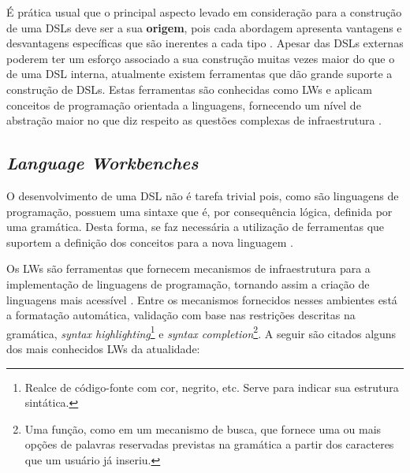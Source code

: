 É prática usual que o principal aspecto levado em consideração para a construção de uma \acp{DSL} deve ser a sua \textbf{origem}, pois cada abordagem apresenta vantagens e desvantagens específicas que são inerentes a cada tipo \cite{Fowler:2010}. 
Apesar das \acp{DSL} externas poderem ter um esforço associado a sua construção muitas vezes maior do que o de uma \ac{DSL} interna, atualmente existem ferramentas que dão grande suporte a construção de \acp{DSL}. 
Estas ferramentas são conhecidas como \acp{LW} e aplicam conceitos de programação orientada a linguagens, fornecendo um nível de abstração maior no que diz respeito as questões complexas de infraestrutura \cite{Fowler:2005}.
    
\subsection{\textit{Language Workbenches}} \label{ssec:LW}

O desenvolvimento de uma \ac{DSL} não é tarefa trivial pois, como são linguagens de programação, possuem uma sintaxe que é, por consequência lógica, definida por uma gramática. 
Desta forma, se faz necessária a utilização de ferramentas que suportem a definição dos conceitos para a nova linguagem \cite{Fowler:2005}.

Os \acp{LW} são ferramentas que fornecem mecanismos de infraestrutura para a implementação de linguagens de programação, tornando assim a criação de linguagens mais acessível \cite{Wachsmuth:2014}. 
Entre os mecanismos fornecidos nesses ambientes está a formatação automática, validação com base nas restrições descritas na gramática, \textit{syntax highlighting}\footnote{Realce de código-fonte com cor, negrito, etc. Serve para indicar sua estrutura sintática.} e \textit{syntax completion}\footnote{Uma função, como em um mecanismo de busca, que fornece uma ou mais opções de palavras reservadas previstas na gramática a partir dos caracteres que um usuário já inseriu.}. 
A seguir são citados alguns dos mais conhecidos \acp{LW} da atualidade:

